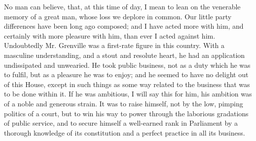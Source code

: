 No man can believe, that, at this time of day, I mean to lean on the venerable memory of a great man, whose loss we deplore in common. Our little party differences have been long ago composed; and I have acted more with him, and certainly with more pleasure with him, than ever I acted against him. Undoubtedly Mr. Grenville was a first-rate figure in this country. With a masculine understanding, and a stout and resolute heart, he had an application undissipated and unwearied. He took public business, not as a duty which he was to fulfil, but as a pleasure he was to enjoy; and he seemed to have no delight out of this House, except in such things as some way related to the business that was to be done within it. If he was ambitious, I will say this for him, his ambition was of a noble and generous strain. It was to raise himself, not by the low, pimping politics of a court, but to win his way to power through the laborious gradations of public service, and to secure himself a well-earned rank in Parliament by a thorough knowledge of its constitution and a perfect practice in all its business.

